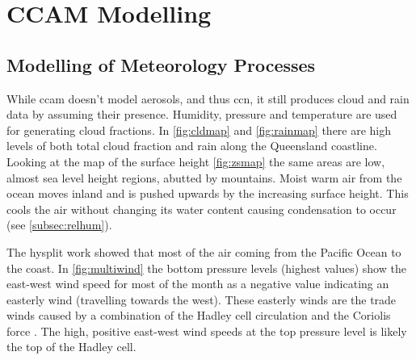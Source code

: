 \clearpage

\section{CCAM Modelling}
\label{sec:ccamwork}

	\subsection{Modelling of Meteorology Processes}
	\label{subsec:metproc}

	While \gls{ccam} doesn't model aerosols, and thus \gls{ccn}, it still produces cloud and rain data by assuming their presence. Humidity, pressure and temperature are used for generating cloud fractions. In \cref{fig:cldmap} and \cref{fig:rainmap} there are high levels of both total cloud fraction and rain along the Queensland coastline. Looking at the map of the surface height \cref{fig:zsmap} the same areas are low, almost sea level height regions, abutted by mountains. Moist warm air from the ocean moves inland and is pushed upwards by the increasing surface height. This cools the air without changing its water content causing condensation to occur (see \cref{subsec:relhum}). 

	The \gls{hysplit} work showed that most of the air coming from the Pacific Ocean to the coast. In \cref{fig:multiwind} the bottom pressure levels (highest values) show the east-west wind speed for most of the month as a negative value indicating an easterly wind (travelling towards the west). These easterly winds are the trade winds caused by a combination of the Hadley cell circulation and the Coriolis force \citep[Chapter 1]{seinfeld2012atmospheric}. The high, positive east-west wind speeds at the top pressure level is likely the top of the Hadley cell.

